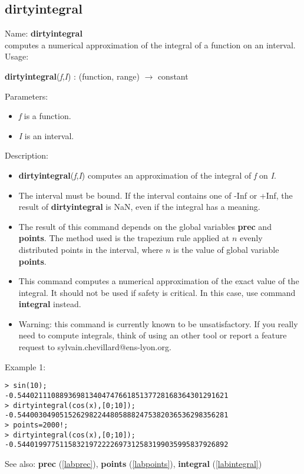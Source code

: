 \subsection{dirtyintegral}
\label{labdirtyintegral}
\noindent Name: \textbf{dirtyintegral}\\
computes a numerical approximation of the integral of a function on an interval.\\
\noindent Usage: 
\begin{center}
\textbf{dirtyintegral}(\emph{f},\emph{I}) : (\textsf{function}, \textsf{range}) $\rightarrow$ \textsf{constant}\\
\end{center}
Parameters: 
\begin{itemize}
\item \emph{f} is a function.
\item \emph{I} is an interval.
\end{itemize}
\noindent Description: \begin{itemize}

\item \textbf{dirtyintegral}(\emph{f},\emph{I}) computes an approximation of the integral of \emph{f} on \emph{I}.

\item The interval must be bound. If the interval contains one of -Inf or +Inf, the 
   result of \textbf{dirtyintegral} is NaN, even if the integral has a meaning.

\item The result of this command depends on the global variables \textbf{prec} and \textbf{points}.
   The method used is the trapezium rule applied at $n$ evenly distributed
   points in the interval, where $n$ is the value of global variable \textbf{points}.

\item This command computes a numerical approximation of the exact value of the 
   integral. It should not be used if safety is critical. In this case, use
   command \textbf{integral} instead.

\item Warning: this command is currently known to be unsatisfactory. If you really
   need to compute integrals, think of using an other tool or report a feature
   request to sylvain.chevillard@ens-lyon.org.
\end{itemize}
\noindent Example 1: 
\begin{center}\begin{minipage}{15cm}\begin{Verbatim}[frame=single]
> sin(10);
-0.54402111088936981340474766185137728168364301291621
> dirtyintegral(cos(x),[0;10]);
-0.54400304905152629822448058882475382036536298356281
> points=2000!;
> dirtyintegral(cos(x),[0;10]);
-0.54401997751158321972222697312583199035995837926892
\end{Verbatim}
\end{minipage}\end{center}
See also: \textbf{prec} (\ref{labprec}), \textbf{points} (\ref{labpoints}), \textbf{integral} (\ref{labintegral})
